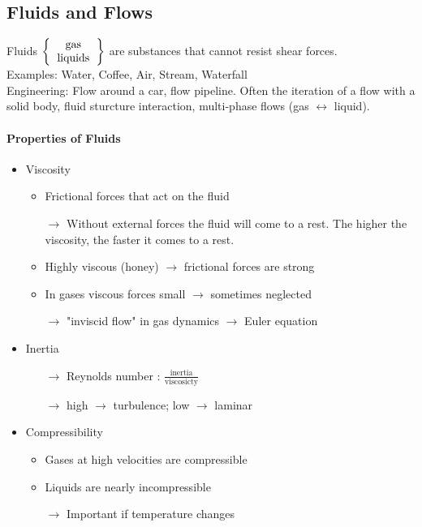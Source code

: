\documentclass[a4paper,11pt]{scrartcl}
\begin{document}
  
\subsection{Fluids and Flows}

Fluids $\left\{
\begin{tabular}{c}
    gas \\
    liquids
\end{tabular}
\right\}$ are substances that cannot resist shear forces. \\
Examples: Water, Coffee, Air, Stream, Waterfall\\
Engineering: Flow around a car, flow pipeline. Often the iteration of a flow with a solid body, fluid sturcture interaction, multi-phase flows (gas $\leftrightarrow$ liquid).

\paragraph{Properties of Fluids}
\begin{itemize}
	\item Viscosity
	\begin{itemize}
		\item Frictional forces that act on the fluid
		\item[$\rightarrow$] Without external forces the fluid will come to a rest. The higher the viscosity, the faster it comes to a rest.
		\item Highly viscous (honey) $\rightarrow$ frictional forces are strong
		\item In gases viscous forces small $\rightarrow$ sometimes neglected
		\item[$\rightarrow$] "inviscid flow" in gas dynamics $\rightarrow$ Euler equation
	\end{itemize}
	\item Inertia
	\begin{itemize}
		\item[$\rightarrow$] Reynolds number : $\frac{\text{inertia}}{\text{viscosicty}}$
		\item[$\rightarrow$] high $\rightarrow$ turbulence; low $\rightarrow$ laminar
	\end{itemize}
	\item Compressibility
	\begin{itemize}
		\item Gases at high velocities are compressible
		\item Liquids are nearly incompressible
		\item[$\rightarrow$] Important if temperature changes
	\end{itemize}
\end{itemize}
\end{document}
